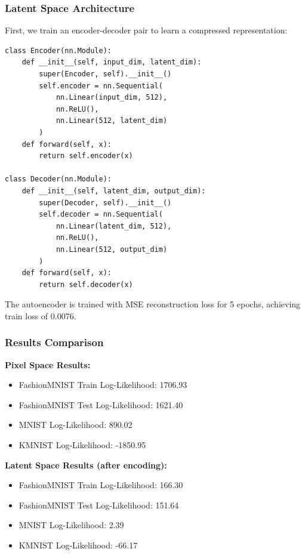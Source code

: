 \documentclass[conference,12pt]{IEEEtran}
\begin{document}
\subsubsection{Latent Space Architecture}

First, we train an encoder-decoder pair to learn a compressed representation:

\begin{lstlisting}[caption={Encoder and Decoder Architecture}]
class Encoder(nn.Module):
    def __init__(self, input_dim, latent_dim):
        super(Encoder, self).__init__()
        self.encoder = nn.Sequential(
            nn.Linear(input_dim, 512),
            nn.ReLU(),
            nn.Linear(512, latent_dim)
        )
    def forward(self, x):
        return self.encoder(x)

class Decoder(nn.Module):
    def __init__(self, latent_dim, output_dim):
        super(Decoder, self).__init__()
        self.decoder = nn.Sequential(
            nn.Linear(latent_dim, 512),
            nn.ReLU(),
            nn.Linear(512, output_dim)
        )
    def forward(self, x):
        return self.decoder(x)
\end{lstlisting}

The autoencoder is trained with MSE reconstruction loss for 5 epochs, achieving train loss of 0.0076.

\subsubsection{Results Comparison}

\textbf{Pixel Space Results:}
\begin{itemize}
    \item FashionMNIST Train Log-Likelihood: 1706.93
    \item FashionMNIST Test Log-Likelihood: 1621.40
    \item MNIST Log-Likelihood: 890.02
    \item KMNIST Log-Likelihood: -1850.95
\end{itemize}

\textbf{Latent Space Results (after encoding):}
\begin{itemize}
    \item FashionMNIST Train Log-Likelihood: 166.30
    \item FashionMNIST Test Log-Likelihood: 151.64
    \item MNIST Log-Likelihood: 2.39
    \item KMNIST Log-Likelihood: -66.17
\end{itemize}
\end{document}
